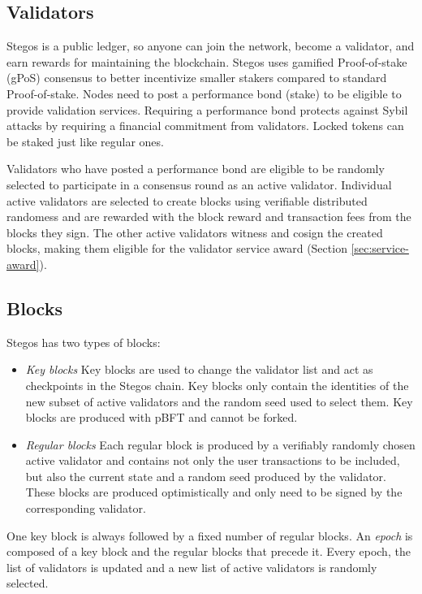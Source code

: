 \documentclass[8pt,fleqn,openany]{book}
\begin{document}
	\subsection{Validators}
	Stegos is a public ledger, so anyone can join the network, become a validator, and earn rewards for maintaining the blockchain. Stegos uses gamified Proof-of-stake (gPoS) consensus to better incentivize smaller stakers compared to standard Proof-of-stake. Nodes need to post a performance bond (stake) to be eligible to provide validation services. Requiring a performance bond protects against Sybil attacks by requiring a financial commitment from validators. Locked tokens can be staked just like regular ones.
	
	Validators who have posted a performance bond are eligible to be randomly selected to participate in a consensus round as an active validator. Individual active validators are selected to create blocks using verifiable distributed randomess and are rewarded with the block reward and transaction fees from the blocks they sign. The other active validators witness and cosign the created blocks, making them eligible for the validator service award (Section \ref{sec:service-award}).  
	
	\subsection{Blocks}\label{sec:blocks}
	Stegos has two types of blocks:
	
	\begin{itemize}
		\item {\em Key blocks} Key blocks are used to change the validator list and act as checkpoints in the Stegos chain. Key blocks only contain the identities of the new subset of active validators and the random seed used to select them. Key blocks are produced with pBFT and cannot be forked.
		\item {\em Regular blocks} Each regular block is produced by a verifiably randomly chosen active validator and contains not only the user transactions to be included, but also the current state and a random seed produced by the validator. These blocks are produced optimistically and only need to be signed by the corresponding validator.
	\end{itemize}
	
	One key block is always followed by a fixed number of regular blocks. An \textit{epoch} is composed of a key block and the regular blocks that precede it. Every epoch, the list of validators is updated and a new list of active validators is randomly selected.
	
\end{document}
